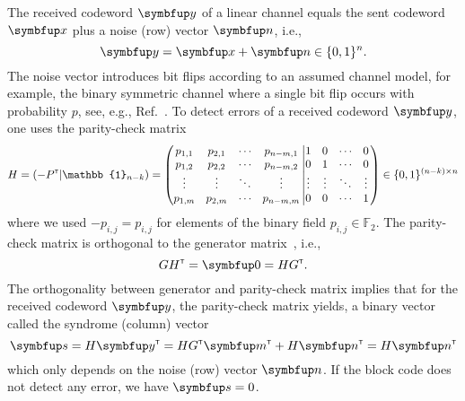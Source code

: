 The received codeword $\vb{y}$ of a linear channel equals the sent codeword $\vb{x}$ plus a noise (row) vector $\vb{n}$, i.e.,
\begin{equation}
	\vb{y}
	=
	\vb{x}
	+
	\vb{n}
	\in\{0,1\}^n
	.
\end{equation}
The noise vector introduces bit flips according to an assumed channel model, for example, the binary symmetric channel where a single bit flip occurs with probability $p$, see, e.g., Ref.~\cite[p.~148]{MacKay2003}.
To detect errors of a received codeword $\vb{y}$, one uses the parity-check matrix
\begin{equation}
	H
	=
	\left(
		-P^\trans
		\vert
		\mathbb{1}_{n-k}
	\right)
	=
	\left(
		\begin{matrix}
			p_{1,1} & p_{2,1} & \cdots & p_{n-m,1} \\
			p_{1,2} & p_{2,2} & \cdots & p_{n-m,2} \\
			\vdots & \vdots & \ddots & \vdots \\
			p_{1,m} & p_{2,m} & \cdots & p_{n-m,m}
		\end{matrix}
		\left|
		\begin{matrix}
			1 & 0 & \cdots & 0 \\
			0 & 1 & \cdots & 0 \\
			\vdots & \vdots & \ddots & \vdots \\
			0 & 0 & \cdots & 1
		\end{matrix}
		\right.
	\right)
	\in\{0,1\}^{(n-k)\times n}
\end{equation}
where we used $-p_{i,j}=p_{i,j}$ for elements of the binary field $p_{i,j}\in\mathbb{F}_2$.
The parity-check matrix is orthogonal to the generator matrix~\cite[p.~95]{Mildenberger2013}, i.e.,
\begin{equation}
	GH^\trans
	=
	\vb{0}
	=
	HG^\trans
	.
\end{equation}
The orthogonality between generator and parity-check matrix implies that for the received codeword $\vb{y}$, the parity-check matrix yields, a binary vector called the syndrome (column) vector
\begin{equation}
	\vb{s}
	=
	H\vb{y}^\trans
	=
	HG^\trans\vb{m}^\trans
	+
	H\vb{n}^\trans
	=
	H\vb{n}^\trans
\end{equation}
which only depends on the noise (row) vector $\vb{n}$.
If the block code does not detect any error, we have $\vb{s}=0$.
